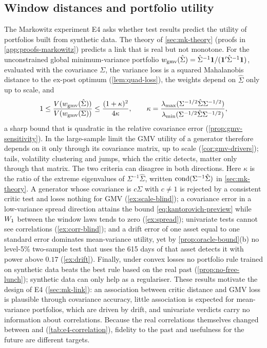 \subsection{Window distances and portfolio utility}\label{sec:theory-markowitz}

The Markowitz experiment E4 asks whether test results predict the utility of portfolios built
from synthetic data. The theory of \cref{sec:mk-theory} (proofs in \cref{app:proofs-markowitz})
predicts a link that is real but not monotone. For the unconstrained global minimum-variance
portfolio $w_{\mathrm{gmv}}(\hat\Sigma)=\hat\Sigma^{-1}\mathbf{1}/(\mathbf{1}'\hat\Sigma^{-1}\mathbf{1})$, evaluated with the
\TEST{} covariance $\Sigma$, the variance loss is a squared Mahalanobis distance to the ex-post
optimum (\cref{lem:quad-loss}), the weights depend on $\hat\Sigma$ only up to scale, and
\begin{equation}\label{eq:kantorovich-preview}
  1\le\frac{V(w_{\mathrm{gmv}}(\hat\Sigma))}{V(w_{\mathrm{gmv}}(\Sigma))}\le\frac{(1+\kappa)^2}{4\kappa},
  \qquad \kappa=\frac{\lambda_{\max}(\Sigma^{-1/2}\hat\Sigma\Sigma^{-1/2})}
  {\lambda_{\min}(\Sigma^{-1/2}\hat\Sigma\Sigma^{-1/2})},
\end{equation}
a sharp bound that is quadratic in the relative covariance error (\cref{prop:gmv-sensitivity}).
In the large-sample limit the GMV utility of a generator therefore depends on it only through its
covariance matrix, up to scale (\cref{cor:gmv-drivers}); tails, volatility clustering and jumps,
which the critic detects, matter only through that matrix. The two criteria can disagree in both
directions. Here $\kappa$ is the ratio of the extreme eigenvalues of $\Sigma^{-1}\hat\Sigma$,
written $\operatorname{cond}(\Sigma^{-1}\hat\Sigma)$ in \cref{sec:mk-theory}. A generator whose covariance is
$c\Sigma$ with $c\neq1$ is rejected by a consistent
critic test and loses nothing for GMV (\cref{ex:scale-blind}); a covariance error in a
low-variance spread direction attains the bound \eqref{eq:kantorovich-preview} while $W_{1}$ between
the window laws tends to zero (\cref{ex:spread}); univariate tests cannot see correlations
(\cref{ex:corr-blind}); and a drift error of one asset equal to one \TRAIN{} standard error
dominates mean-variance utility, yet by \cref{prop:oracle-bound}(b) no level-5\% two-sample test
that uses the 615 \TEST{} days of that asset detects it with power above $0.17$
(\cref{ex:drift}). Finally, under convex
losses no portfolio rule trained on synthetic data beats the best rule based on the real past
(\cref{prop:no-free-lunch}); synthetic data can only help as a regulariser. These results motivate
the design of E4 (\cref{sec:mk-link}): an association between critic distance and GMV loss is
plausible through covariance accuracy, little association is expected for mean-variance
portfolios, which are driven by drift, and univariate verdicts carry no information about
correlations. Because the real correlations themselves changed between \TRAIN{} and \TEST{}
(\cref{tab:e4-correlation}), fidelity to the past and usefulness for the future are different
targets.

